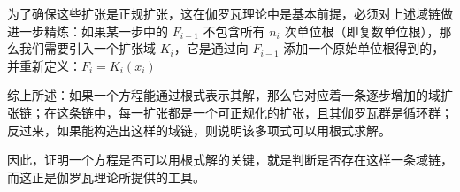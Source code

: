 为了确保这些扩张是正规扩张，这在伽罗瓦理论中是基本前提，必须对上述域链做进一步精炼：如果某一步中的 $F_{i-1}$ 不包含所有 $n_i$ 次单位根（即复数单位根），那么我们需要引入一个扩张域 $K_i$，它是通过向 $F_{i-1}$ 添加一个原始单位根得到的，并重新定义：$F_i = K_i(x_i)$

综上所述：如果一个方程能通过根式表示其解，那么它对应着一条逐步增加的域扩张链；在这条链中，每一扩张都是一个可正规化的扩张，且其伽罗瓦群是循环群；反过来，如果能构造出这样的域链，则说明该多项式可以用根式求解。

因此，证明一个方程是否可以用根式解的关键，就是判断是否存在这样一条域链，而这正是伽罗瓦理论所提供的工具。
